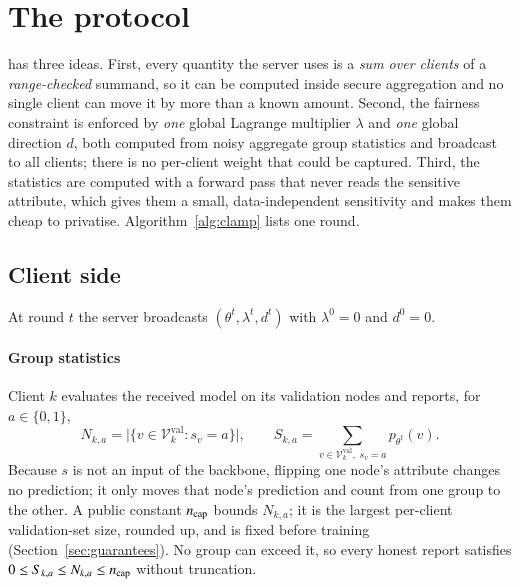 \section{The \clamp{} protocol}\label{sec:method}

\clamp{} has three ideas. First, every quantity the server uses is a \emph{sum over clients} of a \emph{range-checked} summand, so it can be computed inside secure aggregation and no single client can move it by more than a known amount. Second, the fairness constraint is enforced by \emph{one} global Lagrange multiplier $\lambda$ and \emph{one} global direction $d$, both computed from noisy aggregate group statistics and broadcast to all clients; there is no per-client weight that could be captured. Third, the statistics are computed with a forward pass that never reads the sensitive attribute, which gives them a small, data-independent sensitivity and makes them cheap to privatise. Algorithm~\ref{alg:clamp} lists one round.

\subsection{Client side}
At round $t$ the server broadcasts $(\theta^t,\lambda^t,d^t)$ with $\lambda^0=0$ and $d^0=0$.

\paragraph{Group statistics}
Client $k$ evaluates the received model on its validation nodes and reports, for $a\in\{0,1\}$,
\begin{equation}\label{eq:stats}
N_{k,a}=\bigl|\{v\in\mathcal{V}^{\mathrm{val}}_k:s_v=a\}\bigr|,\qquad S_{k,a}=\sum_{v\in\mathcal{V}^{\mathrm{val}}_k,\;s_v=a}p_{\theta^t}(v).
\end{equation}
Because $s$ is not an input of the backbone, flipping one node's attribute changes no prediction; it only moves that node's prediction and count from one group to the other. A public constant $n_{\mathrm{cap}}$ bounds $N_{k,a}$; it is the largest per-client validation-set size, rounded up, and is fixed before training (Section~\ref{sec:guarantees}). No group can exceed it, so every honest report satisfies $0\le S_{k,a}\le N_{k,a}\le n_{\mathrm{cap}}$ without truncation.

